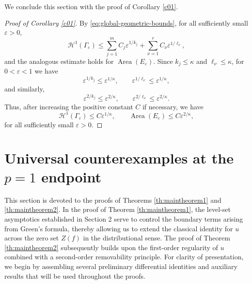 \documentclass[12pt,twoside]{amsart}
\numberwithin{equation}{section}
\numberwithin{definition}{section} %
\begin{document}
   
We conclude this section with the proof of Corollary \ref{c01}.
\begin{proof}[Proof of Corollary \ref{c01}]

By \eqref{eq:global-geometric-bounds}, for all sufficiently small
$\varepsilon>0$,
\[
\mathcal H^1(\Gamma_\varepsilon)
\leq
\sum_{j=1}^m C_j\varepsilon^{1/k_j}
+\sum_{\nu=1}^r C_\nu\varepsilon^{1/\ell_\nu},
\]
and the analogous estimate holds for
$\operatorname{Area}(E_\varepsilon)$.
Since $k_{j} \leq \kappa$ and $\ell_{
\nu} \leq \kappa$, for $0 < \varepsilon < 1$ we have
\[
\varepsilon^{1/k_{j}} \leq \varepsilon^{1/\kappa}, \qquad \varepsilon^{1/\ell_{
\nu}} \leq \varepsilon^{1/\kappa},
\]
and similarly,
\[
\varepsilon^{2/k_{j}} \leq \varepsilon^{2/\kappa}, \qquad \varepsilon^{2/\ell_{
\nu}} \leq \varepsilon^{2/\kappa}.
\]
Thus, after increasing the positive constant $C$ if necessary, we have
\[
\mathcal{H}^{1}(\Gamma_{\varepsilon}) \leq C \varepsilon^{1/\kappa}, \qquad \operatorname{Area}(E_{\varepsilon}) \leq C \varepsilon^{2/\kappa},
\]
for all sufficiently small $\varepsilon > 0$.
	\end{proof}

\section{Universal counterexamples at the $p = 1$ endpoint }\label{sec3}

This section is devoted to the proofs of Theorems \ref{th:maintheorem1} and \ref{th:maintheorem2}. In the proof of Theorem \ref{th:maintheorem1}, the level-set asymptotics established in  Section 2  serve to control the boundary terms arising from Green's formula, thereby allowing us to extend the classical identity for $u$ across the zero set $Z(f)$ in the distributional sense. The proof of Theorem \ref{th:maintheorem2} subsequently builds upon the first-order regularity of $u$ combined with a second-order removability principle. For clarity of presentation, we begin by assembling several preliminary differential identities and auxiliary results that will be used throughout the proofs.
\end{document}
